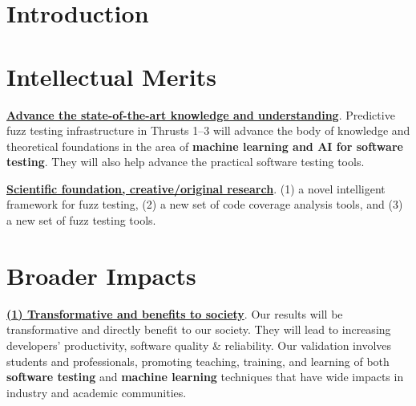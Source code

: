 \section{Introduction}
\label{sec:intro}









\section{Intellectual Merits}


\noindent \underline{{\bf Advance the state-of-the-art knowledge and
    understanding}}. Predictive fuzz testing infrastructure in Thrusts
1--3 will advance the body of knowledge and theoretical foundations in
the area of {\bf machine learning and AI for software testing}. They
will also help advance the practical software testing tools.

\noindent \underline{{\bf Scientific foundation, creative/original
    research}}. (1) a novel intelligent framework for fuzz testing,
(2) a new set of code coverage analysis tools, and (3) a new set of
fuzz testing tools.

\section{Broader Impacts}

\underline{{\bf (1) Transformative and benefits to society}}. Our
results will be transformative and directly benefit to our society.
They will lead to increasing developers' productivity, software
quality \& reliability.  Our validation involves students and
professionals, promoting teaching, training, and learning of both {\bf
  software testing} and {\bf machine learning} techniques that have
wide impacts in industry and academic communities.

